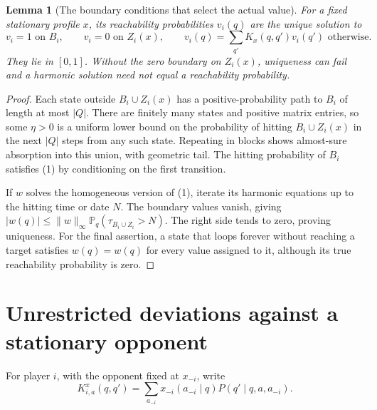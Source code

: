 \documentclass[11pt]{article}
\newtheorem{lemma}[theorem]{Lemma}
\theoremstyle{remark}\newtheorem{remark}[theorem]{Remark}
\newcommand{\Prb}{\mathbb P}
\begin{document}
\begin{lemma}[The boundary conditions that select the actual value]\label{lem:value}
For a fixed stationary profile $x$, its reachability probabilities $v_i(q)$ are the unique solution to
\[
 v_i=1\text{ on }B_i,\qquad v_i=0\text{ on }Z_i(x),\qquad
 v_i(q)=\sum_{q'}K_x(q,q')v_i(q')\text{ otherwise}.                 \tag{1}
\]
They lie in $[0,1]$. Without the zero boundary on $Z_i(x)$, uniqueness can fail and a harmonic solution need not equal a reachability probability.
\end{lemma}
\begin{proof}
Each state outside $B_i\cup Z_i(x)$ has a positive-probability path to $B_i$ of length at most $|Q|$. There are finitely many states and positive matrix entries, so some $\eta>0$ is a uniform lower bound on the probability of hitting $B_i\cup Z_i(x)$ in the next $|Q|$ steps from any such state. Repeating in blocks shows almost-sure absorption into this union, with geometric tail. The hitting probability of $B_i$ satisfies (1) by conditioning on the first transition.

If $w$ solves the homogeneous version of (1), iterate its harmonic equations up to the hitting time or date $N$. The boundary values vanish, giving
$|w(q)|\leq\|w\|_\infty\Prb_q(\tau_{B_i\cup Z_i}>N)$. The right side tends to zero, proving uniqueness. For the final assertion, a state that loops forever without reaching a target satisfies $w(q)=w(q)$ for every value assigned to it, although its true reachability probability is zero.
\end{proof}

\section*{Unrestricted deviations against a stationary opponent}
For player $i$, with the opponent fixed at $x_{-i}$, write
\[
 K_{i,a}^x(q,q')=\sum_{a_{-i}}x_{-i}(a_{-i}\mid q)P(q'\mid q,a,a_{-i}).
\]
\end{document}

